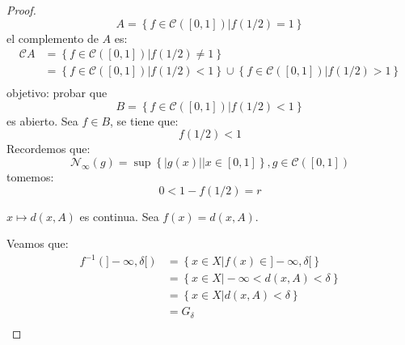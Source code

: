 \documentclass[12pt]{report}
\newcounter{it}
\theoremstyle{largebreak}
\newcommand\abs[1]{\ensuremath{\left|#1\right|}}
\begin{document}
    \begin{proof}
        \begin{equation*}
            A=\left\{f\in\mathcal{C}([0,1])\Big|f(1/2)=1 \right\}
        \end{equation*}
        el complemento de $A$ es:
        \begin{equation*}
            \begin{split}
                \mathcal{C}A&=\left\{f\in\mathcal{C}([0,1])\Big| f(1/2)\neq 1 \right\}\\
                &=\left\{f\in\mathcal{C}([0,1])\Big| f(1/2)<1 \right\}\cup\left\{f\in\mathcal{C}([0,1])\Big| f(1/2)>1 \right\} \\
            \end{split}
        \end{equation*}
        objetivo: probar que
        \begin{equation*}
            B=\left\{f\in\mathcal{C}([0,1])\Big| f(1/2)<1 \right\}
        \end{equation*}
        es abierto. Sea $f\in B$, se tiene que:
        \begin{equation*}
            f(1/2)<1
        \end{equation*}
        Recordemos que:
        \begin{equation}
            \mathcal{N}_\infty(g)=\sup\left\{\abs{g(x)}\Big|x\in[0,1] \right\},g\in\mathcal{C}([0,1])
        \end{equation}
        tomemos:
        \begin{equation*}
            0<1-f(1/2)=r
        \end{equation*}

        $x\mapsto d(x,A)$ es continua. Sea $f(x)=d(x,A)$.

        Veamos que:
        \begin{equation*}
            \begin{split}
                f^{-1}(]-\infty,\delta[)&=\left\{x\in X\Big|f(x)\in]-\infty,\delta[ \right\}\\
                &=\left\{x\in X\Big|-\infty<d(x,A)<\delta \right\}\\
                &=\left\{x\in X\Big|d(x,A)<\delta \right\}\\
                &=G_\delta\\
            \end{split}
        \end{equation*}
    \end{proof}
\end{document}
